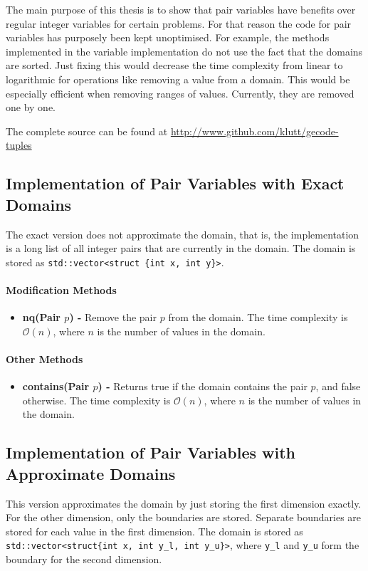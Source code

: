 \documentclass[a4paper,11pt]{article}
\begin{document}
The main purpose of this thesis is to show that pair variables have benefits over regular integer variables for certain problems. For that reason the code for pair variables has purposely been kept unoptimised. For example, the methods implemented in the variable implementation do not use the fact that the domains are sorted. Just fixing this would decrease the time complexity from linear to logarithmic for operations like removing a value from a domain. This would be especially efficient when removing ranges of values. Currently, they are removed one by one.

The complete source can be found at \url{http://www.github.com/klutt/gecode-tuples}

\subsection{Implementation of Pair Variables with Exact Domains}
The exact version does not approximate the domain, that is, the implementation is a long list of all integer pairs that are currently in the domain. The domain is stored as \texttt{std::vector<struct \{int x, int y\}>}. 

\paragraph{Modification Methods}
\begin{itemize}
\item {\textbf{nq(Pair $p$) - }} Remove the pair $p$ from the domain. The time complexity is $\mathcal{O}(n)$, where $n$ is the number of values in the domain. 
\end{itemize}

\paragraph{Other Methods}
\begin{itemize}
\item {\textbf{contains(Pair $p$) - }} Returns true if the domain contains the pair $p$, and false otherwise. The time complexity is  $\mathcal{O}(n)$, where $n$ is the number of values in the domain.
\end{itemize}

\subsection{Implementation of Pair Variables with Approximate Domains}
\label{sec:impapprox}
This version approximates the domain by just storing the first dimension exactly. For the other dimension, only the boundaries are stored. Separate boundaries are stored for each value in the first dimension. The domain is stored as \texttt{std::vector<struct\{int x, int y\_l, int y\_u\}>}, where \texttt{y\_l} and \texttt{y\_u} form the boundary for the second dimension.
\end{document}

